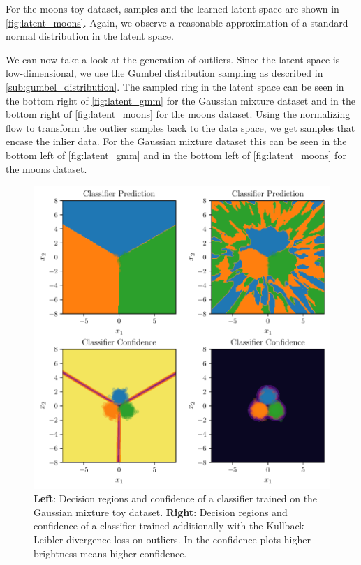 For the moons toy dataset, samples and the learned latent space are shown in
\autoref{fig:latent_moons}. Again, we observe a reasonable approximation
of a standard normal distribution in the latent space.

We can now take a look at the generation of outliers. Since the latent space is
low-dimensional, we use the Gumbel distribution sampling as described in
\autoref{sub:gumbel_distribution}. The sampled ring in
the latent space can be seen in the bottom right of \autoref{fig:latent_gmm} for the
Gaussian mixture dataset and in the bottom right of \autoref{fig:latent_moons} for the
moons dataset. Using the normalizing flow to transform the outlier samples back
to the data space, we get samples that encase the inlier data. For the Gaussian
mixture dataset this can be seen in the bottom left of \autoref{fig:latent_gmm} and
in the bottom left of \autoref{fig:latent_moons} for the moons dataset.

\begin{figure}[htpb]
	\centering
        \includegraphics{figures/toy_example/gaussian_mixture/classifier.pdf}
        \caption{\textbf{Left}: Decision regions and confidence of a classifier trained on the
            Gaussian mixture toy dataset. \textbf{Right}: Decision regions and
            confidence of a classifier trained additionally with the
        Kullback-Leibler divergence loss on outliers. In the confidence plots
    higher brightness means higher confidence.}%
	\label{fig:classifier_gmm}
\end{figure}


